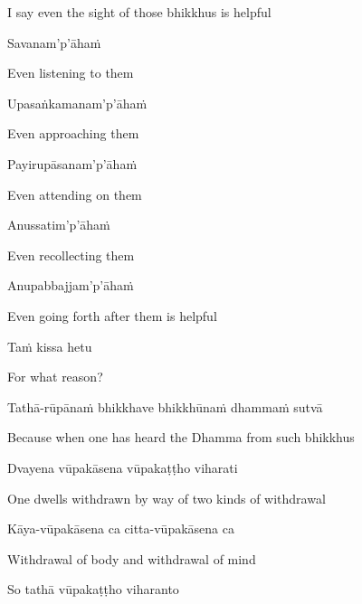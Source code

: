 \begin{english}
  I say even the sight of those bhikkhus is helpful
\end{english}

Savanam'p'āhaṁ

\begin{english}
  Even listening to them
\end{english}

Upasaṅkamanam'p'āhaṁ

\begin{english}
  Even approaching them
\end{english}

Payirupāsanam'p'āhaṁ

\begin{english}
  Even attending on them
\end{english}

Anussatim'p'āhaṁ

\begin{english}
  Even recollecting them
\end{english}

Anupabbajjam'p'āhaṁ

\begin{english}
  Even going forth after them is helpful
\end{english}

Taṁ kissa hetu

\begin{english}
  For what reason?
\end{english}

Tathā-rūpānaṁ bhikkhave bhikkhūnaṁ dhammaṁ sutvā

\begin{english}
  Because when one has heard the Dhamma from such bhikkhus
\end{english}

Dvayena vūpakāsena vūpakaṭṭho viharati

\begin{english}
  One dwells withdrawn by way of two kinds of withdrawal
\end{english}

\ifninebythirteenversion\clearpage\fi

Kāya-vūpakāsena ca citta-vūpakāsena ca

\begin{english}
  Withdrawal of body and withdrawal of mind
\end{english}

So tathā vūpakaṭṭho viharanto

